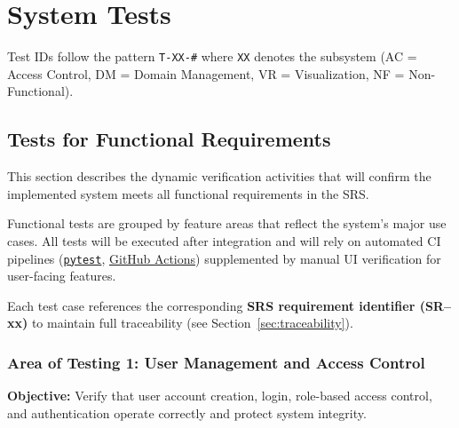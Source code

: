 \documentclass[12pt, titlepage]{article}
\begin{document}
\section{System Tests}
\label{sec:system-tests}
Test IDs follow the pattern \texttt{T-XX-\#} where \texttt{XX} denotes the
subsystem (AC = Access Control, DM = Domain Management, VR = Visualization,
NF = Non-Functional).

\subsection{Tests for Functional Requirements}
\label{subsec:functional-tests}

This section describes the dynamic verification activities that will confirm the implemented system meets all functional requirements in the SRS.

Functional tests are grouped by feature areas that reflect the system’s major use cases.
All tests will be executed after integration and will rely on automated CI pipelines
(\texttt{\href{https://requests-mock.readthedocs.io/en/latest/overview.html}{pytest}}, \href{https://github.com/thaafei/DomainX/actions}{GitHub Actions}) supplemented by manual UI verification for user-facing features.

Each test case references the corresponding \textbf{SRS requirement identifier (SR--xx)} to maintain full traceability (see Section~\ref{sec:traceability}).

\subsubsection{Area of Testing 1: User Management and Access Control}
\textbf{Objective:} Verify that user account creation, login, role-based access control, and authentication operate correctly and protect system integrity.
\end{document}
